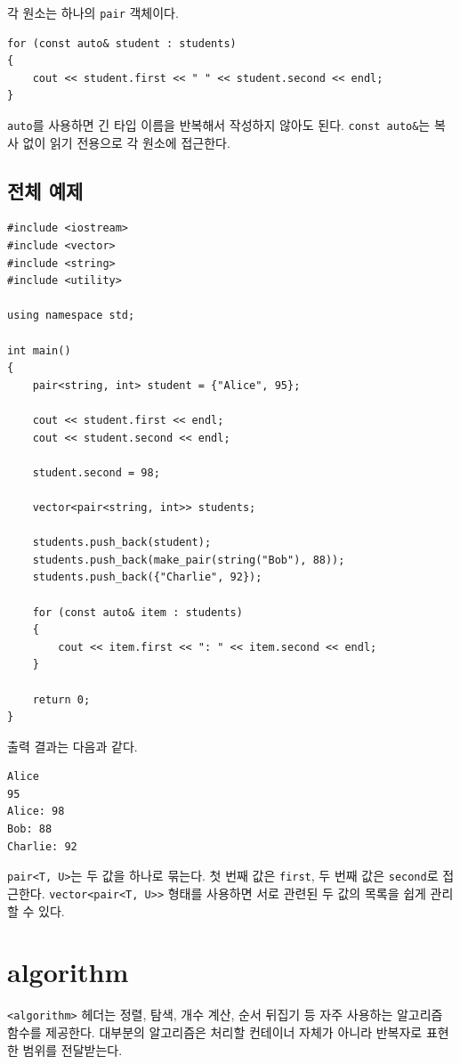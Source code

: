 \documentclass[11pt,a4paper]{article}
\begin{document}
각 원소는 하나의 \texttt{pair} 객체이다.

\begin{lstlisting}
for (const auto& student : students)
{
    cout << student.first << " " << student.second << endl;
}
\end{lstlisting}

\texttt{auto}를 사용하면 긴 타입 이름을 반복해서 작성하지 않아도 된다. \texttt{const auto\&}는 복사 없이 읽기 전용으로 각 원소에 접근한다.

\subsection{전체 예제}
\begin{lstlisting}
#include <iostream>
#include <vector>
#include <string>
#include <utility>

using namespace std;

int main()
{
    pair<string, int> student = {"Alice", 95};

    cout << student.first << endl;
    cout << student.second << endl;

    student.second = 98;

    vector<pair<string, int>> students;

    students.push_back(student);
    students.push_back(make_pair(string("Bob"), 88));
    students.push_back({"Charlie", 92});

    for (const auto& item : students)
    {
        cout << item.first << ": " << item.second << endl;
    }

    return 0;
}
\end{lstlisting}

출력 결과는 다음과 같다.

\begin{verbatim}
Alice
95
Alice: 98
Bob: 88
Charlie: 92
\end{verbatim}

\begin{importantbox}
\texttt{pair<T, U>}는 두 값을 하나로 묶는다. 첫 번째 값은 \texttt{first}, 두 번째 값은 \texttt{second}로 접근한다. \texttt{vector<pair<T, U>>} 형태를 사용하면 서로 관련된 두 값의 목록을 쉽게 관리할 수 있다.
\end{importantbox}

\section{algorithm}
\texttt{<algorithm>} 헤더는 정렬, 탐색, 개수 계산, 순서 뒤집기 등 자주 사용하는 알고리즘 함수를 제공한다. 대부분의 알고리즘은 처리할 컨테이너 자체가 아니라 반복자로 표현한 범위를 전달받는다.
\end{document}
